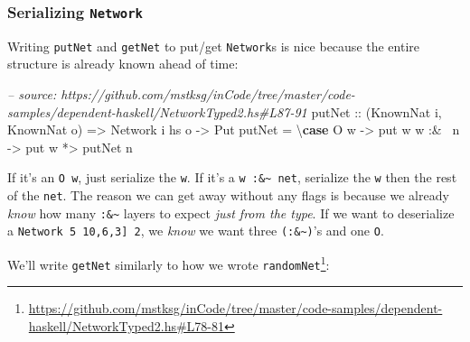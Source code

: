 \documentclass[]{article}
\newenvironment{Shaded}{}{}
\newcommand{\KeywordTok}[1]{\textcolor[rgb]{0.00,0.44,0.13}{\textbf{{#1}}}}
\newcommand{\DataTypeTok}[1]{\textcolor[rgb]{0.56,0.13,0.00}{{#1}}}
\newcommand{\CommentTok}[1]{\textcolor[rgb]{0.38,0.63,0.69}{\textit{{#1}}}}
\newcommand{\OtherTok}[1]{\textcolor[rgb]{0.00,0.44,0.13}{{#1}}}
\newcommand{\FunctionTok}[1]{\textcolor[rgb]{0.02,0.16,0.49}{{#1}}}
\newcommand{\NormalTok}[1]{{#1}}
\renewcommand{\href}[2]{#2\footnote{\url{#1}}}
\begin{document}
\subsubsection{\texorpdfstring{Serializing
\texttt{Network}}{Serializing Network}}\label{serializing-network}

Writing \texttt{putNet} and \texttt{getNet} to put/get \texttt{Network}s is nice
because the entire structure is already known ahead of time:

\begin{Shaded}
\begin{Highlighting}[]
\CommentTok{-- source: https://github.com/mstksg/inCode/tree/master/code-samples/dependent-haskell/NetworkTyped2.hs#L87-91}
\OtherTok{putNet ::} \NormalTok{(}\DataTypeTok{KnownNat} \NormalTok{i, }\DataTypeTok{KnownNat} \NormalTok{o)}
       \OtherTok{=>} \DataTypeTok{Network} \NormalTok{i hs o}
       \OtherTok{->} \DataTypeTok{Put}
\NormalTok{putNet }\FunctionTok{=} \NormalTok{\textbackslash{}}\KeywordTok{case} \DataTypeTok{O} \NormalTok{w     }\OtherTok{->} \NormalTok{put w}
               \NormalTok{w }\FunctionTok{:&~} \NormalTok{n }\OtherTok{->} \NormalTok{put w }\FunctionTok{*>} \NormalTok{putNet n}
\end{Highlighting}
\end{Shaded}

If it's an \texttt{O\ w}, just serialize the \texttt{w}. If it's a
\texttt{w\ :\&\textasciitilde{}\ net}, serialize the \texttt{w} then the rest of
the \texttt{net}. The reason we can get away without any flags is because we
already \emph{know} how many \texttt{:\&\textasciitilde{}} layers to expect
\emph{just from the type}. If we want to deserialize a
\texttt{Network\ 5\ \textquotesingle{}{[}10,6,3{]}\ 2}, we \emph{know} we want
three \texttt{(:\&\textasciitilde{})}'s and one \texttt{O}.

We'll write \texttt{getNet} similarly to how we wrote
\href{https://github.com/mstksg/inCode/tree/master/code-samples/dependent-haskell/NetworkTyped2.hs\#L78-81}{\texttt{randomNet\textquotesingle{}}}:

\begin{Shaded}
\end{Shaded}
\end{document}
